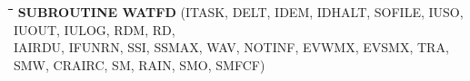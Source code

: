\documentclass[11pt]{article}
\begin{document}
\nwln
\begin{tabbing}
\hspace{1.27cm}\=\hspace{1.27cm}\=\hspace{1.27cm}\=\hspace{1.27cm}\=%
\hspace{1.27cm}\=\hspace{1.27cm}\=\hspace{1.27cm}\=\hspace{1.27cm}\=%
\hspace{1.27cm}\=\hspace{1.27cm}\=\kill
{\bf SUBROUTINE WATFD}\> \> \> (ITASK, DELT, IDEM, IDHALT, SOFILE, IUSO, IUOUT, IULOG, RDM, RD,\\
 \>\> \> \>  IAIRDU, IFUNRN, SSI, SSMAX, WAV, NOTINF, EVWMX, EVSMX, TRA,\\
 \>\> \> \>  SMW, CRAIRC, SM, RAIN, SMO, SMFCF)
\end{tabbing}
\nwln
\end{document}
